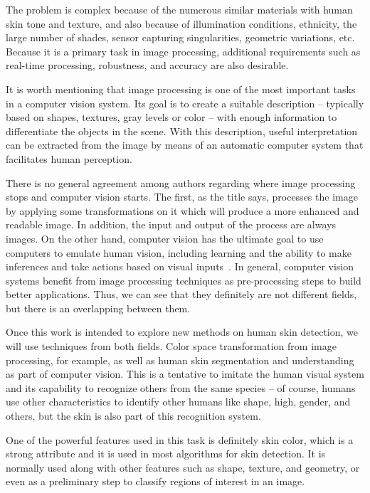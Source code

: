 The problem is complex because of the numerous similar materials with human skin tone and texture, and also because of illumination conditions, ethnicity, the large number of shades, sensor capturing singularities, geometric variations, etc. Because it is a primary task in image processing, additional requirements such as real-time processing, robustness, and accuracy are also desirable.

It is worth mentioning that image processing is one of the most important tasks in a computer vision system. Its goal is to create a suitable description -- typically based on shapes, textures, gray levels or color -- with enough information to differentiate the objects in the scene. With this description, useful interpretation can be extracted from the image by means of an automatic computer system that facilitates human perception.

There is no general agreement among authors regarding where image processing stops and computer vision starts. The first, as the title says, processes the image by applying some transformations on it which will produce a more enhanced and readable image. In addition, the input and output of the process are always images. On the other hand, computer vision has the ultimate goal to use computers to emulate human vision, including learning and the ability to make inferences and take actions based on visual inputs~\citep{gonzalez:02}. In general,
computer vision systems benefit from image processing techniques as pre-processing steps to build better applications. Thus, we can see that they definitely are not different fields, but there is an overlapping between them.

Once this work is intended to explore new methods on human skin detection, we will use techniques from both fields. Color space transformation from image processing, for example, as well as human skin segmentation and understanding as part of computer vision. This is a tentative to imitate the human visual system and its capability to recognize others from the same species -- of course, humans use other characteristics to identify other humans like shape, high, gender, and others, but the skin is also part of this recognition system.

One of the powerful features used in this task is definitely skin color, which is a strong attribute and it is used in most algorithms for skin detection. It is normally used along with other features such as shape, texture, and geometry, or even as a preliminary step to classify regions of interest in an image.

